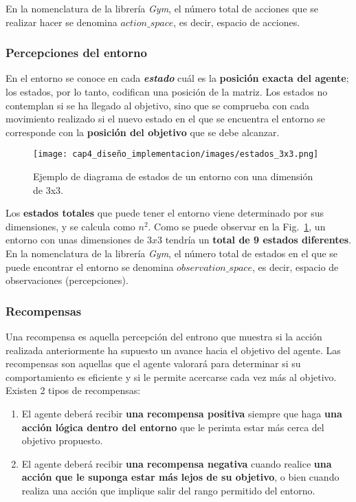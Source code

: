 En la nomenclatura de la librería \textit{Gym}, el número total de acciones que se realizar hacer se denomina $action\_space$, es decir, espacio de acciones.

\subsubsection{Percepciones del entorno} En el entorno se conoce en cada \textbf{\textit{estado}} cuál es la \textbf{posición exacta del agente}; los estados, por lo tanto, codifican una posición de la matriz. Los estados no contemplan si se ha llegado al objetivo, sino que se comprueba con cada movimiento realizado si el nuevo estado en el que se encuentra el entorno se corresponde con la \textbf{posición del objetivo} que se debe alcanzar. \\

\begin{figure}[!h]
    \centering
    \texttt{[image: cap4\_diseño\_implementacion/images/estados\_3x3.png]}
    \caption{Ejemplo de diagrama de estados de un entorno con una dimensión de 3x3.}
    \label{fig:estados_3x3}
\end{figure}

Los \textbf{estados totales} que puede tener el entorno viene determinado por sus dimensiones, y se calcula como $n^2$. Como se puede observar en la Fig.~\ref{fig:estados_3x3}, un entorno con unas dimensiones de $3x3$ tendría un \textbf{total de 9 estados diferentes}. \\

En la nomenclatura de la librería \textit{Gym}, el número total de estados en el que se puede encontrar el entorno se denomina $observation\_space$, es decir, espacio de observaciones (percepciones).

\subsubsection{Recompensas} 

Una recompensa es aquella percepción del entrono que muestra si la acción realizada anteriormente ha supuesto un avance hacia el objetivo del agente. Las recompensas son aquellas que el agente valorará para determinar si su comportamiento es eficiente y si le permite acercarse cada vez más al objetivo. \\

Existen 2 tipos de recompensas: 

\begin{enumerate}
    \item El agente deberá recibir \textbf{una recompensa positiva} siempre que haga \textbf{una acción lógica dentro del entorno} que le perimta estar más cerca del objetivo propuesto. 
    \item El agente deberá recibir \textbf{una recompensa negativa} cuando realice \textbf{una acción que le suponga estar más lejos de su objetivo}, o bien cuando realiza una acción que implique salir del rango permitido del entorno. 
\end{enumerate}


